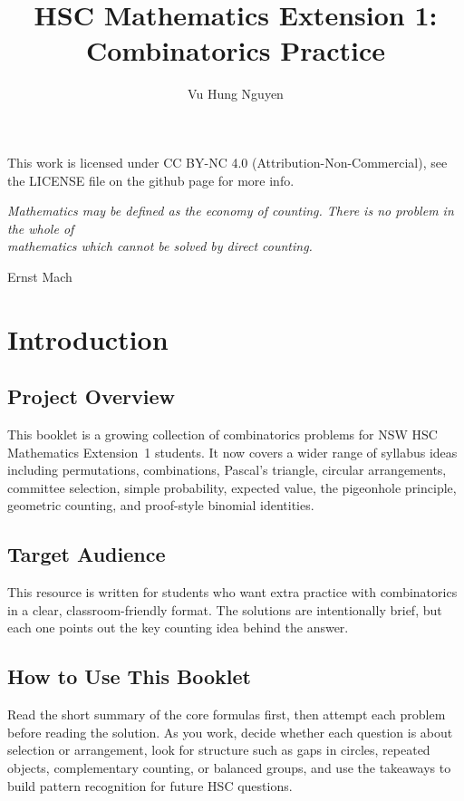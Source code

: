 \documentclass[12pt]{article}
\author{Vu Hung Nguyen}
\title{HSC Mathematics Extension 1: Combinatorics Practice}
\date{}
\begin{document}


\newpage



\begingroup\small\noindent This work is licensed under CC BY-NC 4.0 (Attribution-Non-Commercial), see the LICENSE file on the github page for more info.\par\endgroup

\newpage

\thispagestyle{empty}
\vspace*{\fill}
\begin{center}
\itshape
Mathematics may be defined as the economy of counting. There is no problem in the whole of\\
mathematics which cannot be solved by direct counting.

\vspace{1em}
\normalfont Ernst Mach
\end{center}
\vspace*{\fill}

\newpage

\tableofcontents
\newpage

\section{Introduction}

\subsection{Project Overview}
This booklet is a growing collection of combinatorics problems for NSW HSC Mathematics Extension~1 students. It now covers a wider range of syllabus ideas including permutations, combinations, Pascal's triangle, circular arrangements, committee selection, simple probability, expected value, the pigeonhole principle, geometric counting, and proof-style binomial identities.

\subsection{Target Audience}
This resource is written for students who want extra practice with combinatorics in a clear, classroom-friendly format. The solutions are intentionally brief, but each one points out the key counting idea behind the answer.

\subsection{How to Use This Booklet}
Read the short summary of the core formulas first, then attempt each problem before reading the solution. As you work, decide whether each question is about selection or arrangement, look for structure such as gaps in circles, repeated objects, complementary counting, or balanced groups, and use the takeaways to build pattern recognition for future HSC questions.
\end{document}
